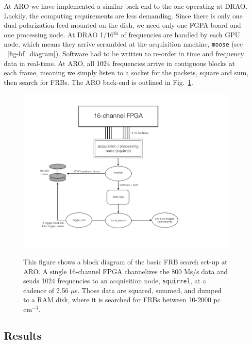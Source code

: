At ARO we have implemented a similar back-end to the 
one operating at DRAO. Luckily, the computing 
requirements are less demanding. Since there is only 
one dual-polarization feed mounted on the dish, 
we need only one FGPA board and one processing node. 
At DRAO 1/16$^{\textrm{th}}$ of frequencies are 
handled by each GPU node, which means they arrive scrambled
at the acquisition machine, {\tt moose} (see ~\ref{fig-bf_diagram}). 
Software had to be written to re-order in time and frequency 
data in real-time. At ARO, all 1024 frequencies arrive in contiguous 
blocks at each frame, meaning we simply listen to a socket 
for the packets, square and sum, then search for FRBs. The ARO 
back-end is outlined in Fig.~\ref{fig-aro_diagram}.


\begin{figure}[!h]
\begin{center}
\includegraphics[trim={0in, 0in, 0in, 0in}, width=\textwidth]{./figures/beamforming/aro_diagram.jpeg}
\caption[abc]{This figure shows a block diagram of the basic 
     FRB search set-up at ARO. A single 16-channel FPGA
     channelizes the 800 Ms/s data and sends 1024 frequencies 
     to an acquisition node, {\tt squirrel}, at a cadence of 2.56 $\mu$s.
     Those data are squared, summed, and dumped to a RAM disk, 
     where it is searched for FRBs between 10-2000 pc cm$^{-3}$.}
\vspace{0.4cm}   
\label{fig-aro_diagram}
\end{center}
\end{figure}

\subsection{Results}

